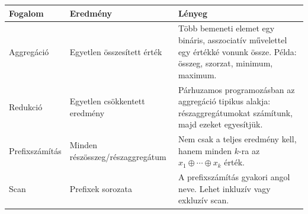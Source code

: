 \begin{tabularx}{\textwidth}{L{28mm}L{39mm}X}
\toprule
\textbf{Fogalom} & \textbf{Eredmény} & \textbf{Lényeg} \\
\midrule
Aggregáció & Egyetlen összesített érték & Több bemeneti elemet egy bináris, asszociatív művelettel egy értékké vonunk össze. Példa: összeg, szorzat, minimum, maximum. \\
Redukció & Egyetlen csökkentett eredmény & Párhuzamos programozásban az aggregáció tipikus alakja: részaggregátumokat számítunk, majd ezeket egyesítjük. \\
Prefixszámítás & Minden részösszeg/részaggregátum & Nem csak a teljes eredmény kell, hanem minden $k$-ra az $x_1\oplus\cdots\oplus x_k$ érték. \\
Scan & Prefixek sorozata & A prefixszámítás gyakori angol neve. Lehet inkluzív vagy exkluzív scan. \\
\bottomrule
\end{tabularx}
